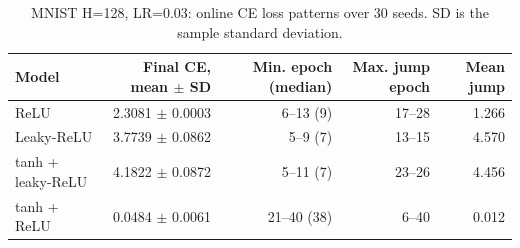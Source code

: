 \begin{table}[htbp]
\centering
\caption{MNIST H=128, LR=0.03: online CE loss patterns over 30 seeds. SD is the sample standard deviation.}
\label{tab:losssignatures}
\footnotesize
\begin{tabular}{@{}lrrrr@{}}
\toprule
Model & Final CE, mean $\pm$ SD & Min. epoch (median) & Max. jump epoch & Mean jump \\
\midrule
ReLU & 2.3081 $\pm$ 0.0003 & 6--13 (9) & 17--28 & 1.266 \\
Leaky-ReLU & 3.7739 $\pm$ 0.0862 & 5--9 (7) & 13--15 & 4.570 \\
tanh + leaky-ReLU & 4.1822 $\pm$ 0.0872 & 5--11 (7) & 23--26 & 4.456 \\
tanh + ReLU & 0.0484 $\pm$ 0.0061 & 21--40 (38) & 6--40 & 0.012 \\
\bottomrule
\end{tabular}
\par{}
\end{table}
